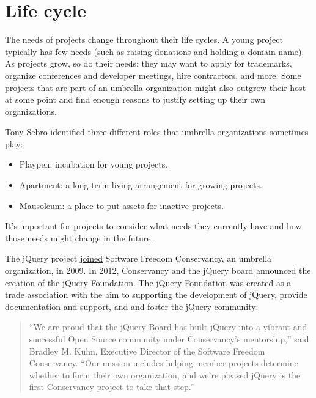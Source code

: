 


\chapter{Life cycle}

The needs of projects change throughout their life cycles.  A young project typically has few needs (such as raising donations and holding a domain name).  As projects grow, so do their needs: they may want to apply for trademarks, organize conferences and developer meetings, hire contractors, and more.  Some projects that are part of an umbrella organization might also outgrow their host at some point and find enough reasons to justify setting up their own organizations.

Tony Sebro \href{https://lwn.net/Articles/548542/}{identified} three different roles that umbrella organizations sometimes play:

\begin{itemize}

\item Playpen: incubation for young projects.

\item Apartment: a long-term living arrangement for growing projects.

\item Mausoleum: a place to put assets for inactive projects.

\end{itemize}

It's important for projects to consider what needs they currently have and how those needs might change in the future.

\begin{kaobox}[frametitle=jQuery and the jQuery Foundation]

The jQuery project \href{https://sfconservancy.org/news/2009/nov/30/jQuery-joins/}{joined} Software Freedom Conservancy, an umbrella organization, in 2009.  In 2012, Conservancy and the jQuery board \href{https://sfconservancy.org/news/2012/mar/06/jQuery-Foundation/}{announced} the creation of the jQuery Foundation.  The jQuery Foundation was created as a trade association with the aim to supporting the development of jQuery, provide documentation and support, and and foster the jQuery community:

\begin{quote}

``We are proud that the jQuery Board has built jQuery into a vibrant and successful Open Source community under Conservancy's mentorship,'' said Bradley M. Kuhn, Executive Director of the Software Freedom Conservancy. ``Our mission includes helping member projects determine whether to form their own organization, and we're pleased jQuery is the first Conservancy project to take that step.''

\end{quote}

\end{kaobox}

